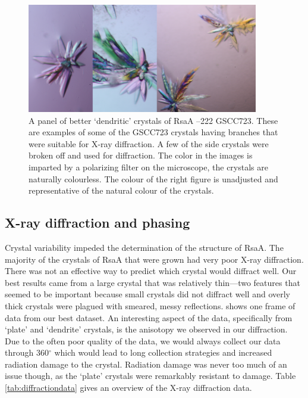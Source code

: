 \begin{figure}[htb]
  	\begin{center}
   		\includegraphics[width=0.9\textwidth]{crystal_chapter/img/nicetrees2.pdf}
   	\end{center}
   	\caption[`Dendritic' RsaA --222 GSCC723 crystals that were used for X-ray diffraction]{A panel of better `dendritic' crystals of RsaA --222 GSCC723. These are examples of some of the GSCC723 crystals having branches that were suitable for X-ray diffraction. A few of the side crystals were broken off and used for diffraction.  The color in the images is imparted by a polarizing filter on the microscope, the crystals are naturally colourless. The colour of the right figure is unadjusted and representative of the natural colour of the crystals.}
   	\label{fig:nice-trees}
\end{figure}   

\subsection{X-ray diffraction and phasing}\label{sec:x-ray-diffraction}

Crystal variability impeded the determination of the structure of RsaA. The majority of the crystals of RsaA that were grown had very poor X-ray diffraction. There was not an effective way to predict which crystal would diffract well. Our best results came from a large crystal that was relatively thin---two features that seemed to be important because small crystals did not diffract well and overly thick crystals were plagued with smeared, messy reflections.  shows one frame of data from our best dataset. An interesting aspect of the data, specifically from `plate' and `dendrite' crystals, is the anisotopy we observed in our diffraction. Due to the often poor quality of the data, we would always collect our data through 360$^{\circ}$ which would lead to long collection strategies and increased radiation damage to the crystal. Radiation damage was never too much of an issue though, as the `plate' crystals were remarkably resistant to damage. Table \ref{tab:diffractiondata} gives an overview of the X-ray diffraction data.

